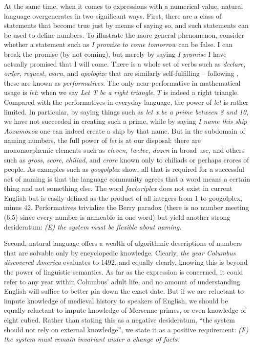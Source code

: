 At the same time, when it comes to expressions with a numerical value, natural
language overgenerates in two significant ways.  First, there are a class of
statements that become true just by means of saying so, and such statements
can be used to define numbers. To illustrate the more general phenomenon,
consider whether a statement such as {\it I promise to come tomorrow} can be
false. I can break the promise (by not coming), but merely by saying {\it I
  promise} I have actually promised that I will come. There is a whole set of
verbs such as {\it declare}, {\it order}, {\it request}, {\it warn}, and {\it
  apologize} that are similarly self-fulfilling -- following
, these are known as {\it performatives}.
 The only near-performative in mathematical usage is {\it
  let}: when we say {\it Let T be a right triangle}, $T$ is indeed a right
triangle.  Compared with the performatives in everyday language, the power of
{\it let} is rather limited. In particular, by saying things such as {\it let
  x be a prime between 8 and 10}, we have not succeeded in creating such a
prime, while by saying {\it I name this ship Aoxamoxoa} one can indeed create
a ship by that name. But in the subdomain of naming numbers, the full power of
{\it let} is at our disposal: there are monomorphemic elements such as {\it
  eleven, twelve, dozen} in broad use, and others such as {\it gross}, {\it
  score}, {\it chiliad}, and {\it crore} known only to chiliads or perhaps
crores of people.  As examples such as {\it googolplex} show, all that is
required for a successful act of naming is that the language community agrees
that a word means a certain thing and not something else. The word {\it
  factoriplex} does not exist in current English but is easily defined as the
product of all integers from 1 to googolplex, minus 42. Performatives
trivialize the Berry paradox (there is no number meeting (6.5) since every
number is nameable in one word) but yield another strong desideratum: {\sl (E)
  the system must be flexible about naming.}

Second, natural language offers a wealth of algorithmic descriptions of
numbers that are solvable only by encyclopedic knowledge. Clearly, {\it the
  year Columbus discovered America} evaluates to 1492, and equally clearly,
knowing this is beyond the power of linguistic semantics. As far as the
expression is concerned, it could refer to any year within Columbus' adult
life, and no amount of understanding English will suffice to better pin down
the exact date.  But if we are reluctant to impute knowledge of medieval
history to speakers of English, we should be equally reluctant to impute
knowledge of Mersenne primes, or even knowledge of eight cubed. Rather than
stating this as a negative desideratum, ``the system should not rely on
external knowledge'', we state it as a positive requirement: {\sl (F) the
  system must remain invariant under a change of facts}.

